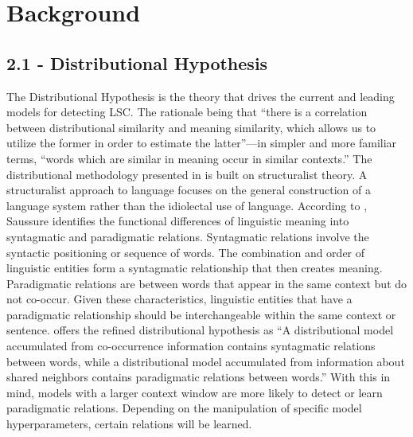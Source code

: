 \section{Background}

\subsection{2.1 - Distributional Hypothesis}

The Distributional Hypothesis is the theory that drives the current and leading models for detecting LSC. The rationale being that “there is a correlation between distributional similarity and meaning similarity, which allows us to utilize the former in order to estimate the latter”—in simpler and more familiar terms, “words which are similar in meaning occur in similar contexts.” \citep{sahlgren2008distributional} The distributional methodology presented in \citet{harris1970distributional} is built on structuralist theory. A structuralist approach to language focuses on the general construction of a language system rather than the idiolectal use of language. According to \citet{sahlgren2008distributional}, Saussure identifies the functional differences of linguistic meaning into syntagmatic and paradigmatic relations. Syntagmatic relations involve the syntactic positioning or sequence of words. The combination and order of linguistic entities form a syntagmatic relationship that then creates meaning. Paradigmatic relations are between words that appear in the same context but do not co-occur. Given these characteristics, linguistic entities that have a paradigmatic relationship should be interchangeable within the same context or sentence. \citet{sahlgren2008distributional} offers the refined distributional hypothesis as “A distributional model accumulated from co-occurrence information contains syntagmatic relations between words, while a distributional model accumulated from information about shared neighbors contains paradigmatic relations between words.” With this in mind, models with a larger context window are more likely to detect or learn paradigmatic relations. Depending on the manipulation of specific model hyperparameters, certain relations will be learned. 



